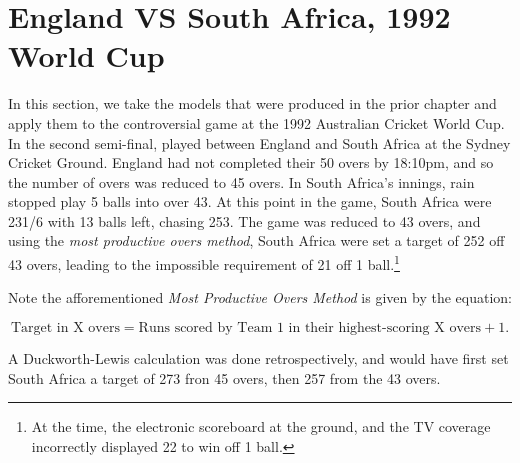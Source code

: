 \section{England VS South Africa, 1992 World Cup}
In this section, we take the models that were produced in the prior chapter and apply them to the controversial game at the 1992 Australian Cricket World Cup. In the second semi-final,
played between England and South Africa at the Sydney Cricket Ground. England had not completed their 50 overs by 18:10pm, and so the number of overs was reduced to 45 overs. In South Africa's
innings, rain stopped play 5 balls into over 43. At this point in the game, South Africa were 231/6 with 13 balls left, chasing 253. The game was reduced to 43 overs, and using the \textit{most 
productive overs method}, South Africa were set a target of 252 off 43 overs, leading to the impossible requirement of 21 off 1 ball.\footnote{At the time, the electronic scoreboard at the ground,
and the TV coverage incorrectly displayed 22 to win off 1 ball.}

Note the afforementioned \textit{Most Productive Overs Method} is given by the equation:

\begin{equation}
    \text{Target in X overs} = \text{Runs scored by Team 1 in their highest-scoring X overs} + 1.
\end{equation}

A Duckworth-Lewis calculation was done retrospectively, and would have first set South Africa a target of 273 fron 45 overs, then 257 from the 43 overs.


